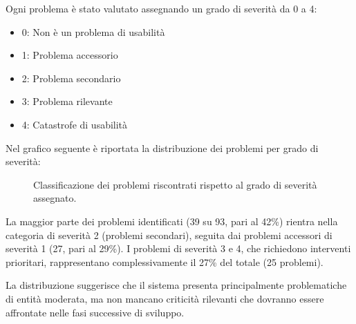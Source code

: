 Ogni problema è stato valutato assegnando un grado di severità da 0 a 4:
\begin{itemize}
  \item 0: Non è un problema di usabilità
  \item 1: Problema accessorio
  \item 2: Problema secondario
  \item 3: Problema rilevante
  \item 4: Catastrofe di usabilità
\end{itemize}
Nel grafico seguente è riportata la distribuzione dei problemi per grado di severità:
\begin{figure}[H]
  \centering
  \label{fig:severita-problemi}
  \caption{Classificazione dei problemi riscontrati rispetto al grado di severità assegnato.}
\end{figure}

La maggior parte dei problemi identificati (39 su 93, pari al 42\%) rientra nella categoria di severità 2 (problemi secondari), seguita dai problemi accessori di severità 1 (27, pari al 29\%). I problemi di severità 3 e 4, che richiedono interventi prioritari, rappresentano complessivamente il 27\% del totale (25 problemi). 

La distribuzione suggerisce che il sistema presenta principalmente problematiche di entità moderata, ma non mancano criticità rilevanti che dovranno essere affrontate nelle fasi successive di sviluppo.